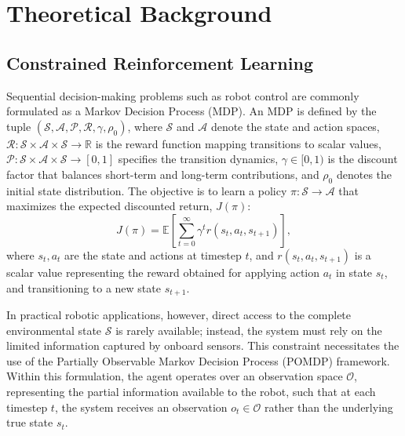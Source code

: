 \section{Theoretical Background}
\label{sec:background}

\subsection{Constrained Reinforcement Learning}
\label{sec:crl}

Sequential decision-making problems such as robot control are commonly formulated as a Markov Decision Process (MDP). An MDP is defined by the tuple $(\mathcal{S}, \mathcal{A}, \mathcal{P}, \mathcal{R}, \gamma, \rho_0)$, where $\mathcal{S}$ and $\mathcal{A}$ denote the state and action spaces, $\mathcal{R}:\mathcal{S}\times\mathcal{A}\times\mathcal{S}\rightarrow\mathbb{R}$ is the reward function mapping transitions to scalar values, $\mathcal{P}:\mathcal{S}\times\mathcal{A}\times\mathcal{S}\rightarrow[0,1]$ specifies the transition dynamics, $\gamma\in[0,1)$ is the discount factor that balances short-term and long-term contributions, and $\rho_0$ denotes the initial state distribution. The objective is to learn a policy $\pi:\mathcal{S}\rightarrow\mathcal{A}$ that maximizes the expected discounted return, $J(\pi)$:
%
\begin{equation}
    J(\pi) = \mathbb{E}\!\left[\sum_{t=0}^{\infty}\gamma^{t} r(s_t, a_t, s_{t+1})\right],
\end{equation}
%
where $s_t, a_t$ are the state and actions at timestep $t$, and $r(s_t,a_t,s_{t+1})$ is a scalar value representing the reward obtained for applying action $a_t$ in state $s_t$, and transitioning to a new state $s_{t+1}$. 

In practical robotic applications, however, direct access to the complete environmental state $\mathcal{S}$ is rarely available; instead, the system must rely on the limited information captured by onboard sensors. This constraint necessitates the use of the Partially Observable Markov Decision Process (POMDP) framework. Within this formulation, the agent operates over an observation space $\mathcal{O}$, representing the partial information available to the robot, such that at each timestep $t$, the system receives an observation $o_t \in \mathcal{O}$ rather than the underlying true state $s_t$. 

